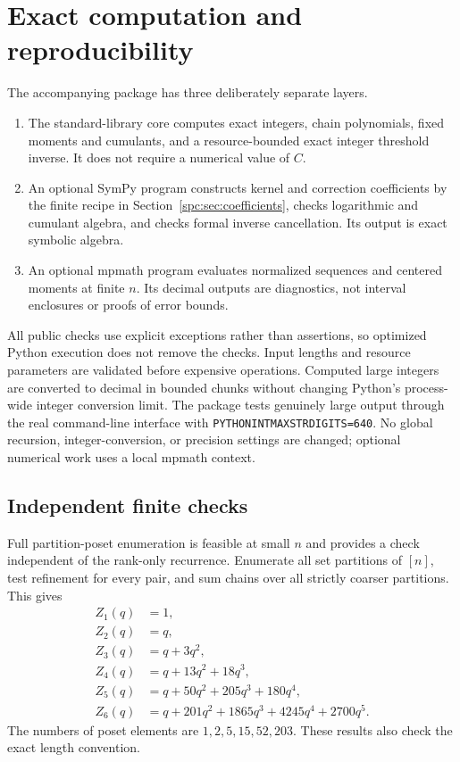 \documentclass[11pt,letterpaper]{article}
\theoremstyle{definition}\newtheorem{definition}[theorem]{Definition}
\theoremstyle{remark}\newtheorem{remark}[theorem]{Remark}
\begin{document}
\section{Exact computation and reproducibility}\label{spc:sec:computation}
The accompanying package has three deliberately separate layers.
\begin{enumerate}
\item The standard-library core computes exact integers, chain polynomials, fixed moments and cumulants, and a resource-bounded exact integer threshold inverse. It does not require a numerical value of $C$.
\item An optional SymPy program constructs kernel and correction coefficients by the finite recipe in Section~\ref{spc:sec:coefficients}, checks logarithmic and cumulant algebra, and checks formal inverse cancellation. Its output is exact symbolic algebra.
\item An optional mpmath program evaluates normalized sequences and centered moments at finite $n$. Its decimal outputs are diagnostics, not interval enclosures or proofs of error bounds.
\end{enumerate}
All public checks use explicit exceptions rather than assertions, so optimized Python execution does not remove the checks. Input lengths and resource parameters are validated before expensive operations. Computed large integers are converted to decimal in bounded chunks without changing Python's process-wide integer conversion limit. The package tests genuinely large output through the real command-line interface with \texttt{PYTHONINTMAXSTRDIGITS=640}. No global recursion, integer-conversion, or precision settings are changed; optional numerical work uses a local mpmath context.

\subsection{Independent finite checks}
Full partition-poset enumeration is feasible at small $n$ and provides a check independent of the rank-only recurrence. Enumerate all set partitions of $[n]$, test refinement for every pair, and sum chains over all strictly coarser partitions. This gives
\begin{align*}
 Z_1(q)&=1,\\
 Z_2(q)&=q,\\
 Z_3(q)&=q+3q^2,\\
 Z_4(q)&=q+13q^2+18q^3,\\
 Z_5(q)&=q+50q^2+205q^3+180q^4,\\
 Z_6(q)&=q+201q^2+1865q^3+4245q^4+2700q^5.
\end{align*}
The numbers of poset elements are $1,2,5,15,52,203$. These results also check the exact length convention.
\end{document}

